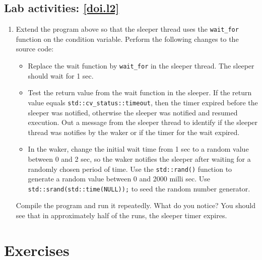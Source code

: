 \documentclass[12pt]{book}
\begin{document}
\subsection{Lab activities: \ref{doi.l2}}\label{wakesleep.se}


\begin{enumerate}[resume*]  
\item Extend the program above so that the sleeper thread uses the \lstinline$wait_for$ function on the condition variable. Perform the following changes to the source code:
  \begin{itemize}[label=--]
  \item Replace the wait function by \lstinline$wait_for$ in the sleeper thread. The sleeper should wait for 1 sec.
    
  \item Test the return value from the wait function in the sleeper. If the return value equals \lstinline$std::cv_status::timeout$, then the timer expired before the sleeper was notified, otherwise the sleeper was notified and resumed execution. Out a message from the sleeper thread to identify if the sleeper thread was notifies by the waker or if the timer for the wait expired.

  \item In the waker, change the initial wait time from 1 sec to a random value between 0 and 2 sec, so the waker notifies the sleeper after waiting for a randomly chosen period of time. Use the \lstinline$std::rand()$ function to generate a random value between 0 and 2000 milli sec. Use \lstinline$std::srand(std::time(NULL));$ to seed the random number generator.
  \end{itemize}

  Compile the program and run it repeatedly. What do you notice? You should see that in approximately half of the runs, the sleeper timer expires. 
  
\end{enumerate}

\section{Exercises}
\end{document}

